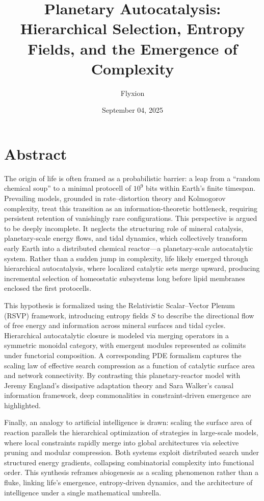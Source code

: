 \documentclass[openany]{book}
\title{Planetary Autocatalysis: Hierarchical Selection, Entropy Fields, and the Emergence of Complexity}
\author{Flyxion}
\date{September 04, 2025}
\begin{document}
\maketitle

\tableofcontents

\section*{Abstract}
The origin of life is often framed as a probabilistic barrier: a leap from a “random chemical soup” to a minimal protocell of $10^9$ bits within Earth’s finite timespan. Prevailing models, grounded in rate–distortion theory and Kolmogorov complexity, treat this transition as an information-theoretic bottleneck, requiring persistent retention of vanishingly rare configurations. This perspective is argued to be deeply incomplete. It neglects the structuring role of mineral catalysis, planetary-scale energy flows, and tidal dynamics, which collectively transform early Earth into a distributed chemical reactor—a planetary-scale autocatalytic system. Rather than a sudden jump in complexity, life likely emerged through hierarchical autocatalysis, where localized catalytic sets merge upward, producing incremental selection of homeostatic subsystems long before lipid membranes enclosed the first protocells.

This hypothesis is formalized using the Relativistic Scalar–Vector Plenum (RSVP) framework, introducing entropy fields $S$ to describe the directional flow of free energy and information across mineral surfaces and tidal cycles. Hierarchical autocatalytic closure is modeled via merging operators in a symmetric monoidal category, with emergent modules represented as colimits under functorial composition. A corresponding PDE formalism captures the scaling law of effective search compression as a function of catalytic surface area and network connectivity. By contrasting this planetary-reactor model with Jeremy England’s dissipative adaptation theory and Sara Walker’s causal information framework, deep commonalities in constraint-driven emergence are highlighted.

Finally, an analogy to artificial intelligence is drawn: scaling the surface area of reaction parallels the hierarchical optimization of strategies in large-scale models, where local constraints rapidly merge into global architectures via selective pruning and modular compression. Both systems exploit distributed search under structured energy gradients, collapsing combinatorial complexity into functional order. This synthesis reframes abiogenesis as a scaling phenomenon rather than a fluke, linking life’s emergence, entropy-driven dynamics, and the architecture of intelligence under a single mathematical umbrella.
\end{document}
